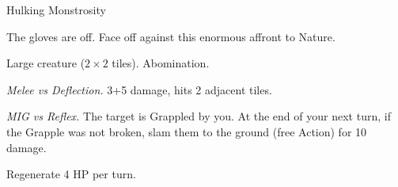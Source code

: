 \begin{monsterboxbg}{Hulking Monstrosity}

    The gloves are off. Face off against this enormous affront to Nature.
    
    \rpghline
    \stats[
        STR = \stat{20}, 
        DEX = \stat{14},
        CON = \stat{18},
        INT = \stat{10},
        WIS = \stat{10},
        CHA = \stat{12},
    ]
    \rpghline

    \basics[
    armorclass = 1,
    hitpoints  = 64,
    focus      = 5,
    defenses   = {Deflection 3, Reflex 3, Fortitude 9, Will 1}
    ]
    \rpghline

    \details[%
    skills = {Athletics 2},
    accuracies = {Melee 4, Ranged 0},
    challenge = Elite,
    ]
    \rpghline%
    \begin{rpg-monsteraction}
        Large creature ($2 \times 2$ tiles). Abomination.
    \end{rpg-monsteraction}

    

    \begin{rpg-monsteraction}
        \textit{Melee vs Deflection.} 3+5 damage, hits 2 adjacent tiles.
    \end{rpg-monsteraction}

    \begin{rpg-monsteraction}
        \textit{MIG vs Reflex.} The target is Grappled by you. At the end of your next turn, if the Grapple was not broken, slam them to the ground (free Action) for 10 damage.
    \end{rpg-monsteraction}

    \begin{rpg-monsteraction}
    \end{rpg-monsteraction}

    \begin{rpg-monsteraction}
    \end{rpg-monsteraction}


    \begin{rpg-monsteraction}[Stalwart]
    \end{rpg-monsteraction}

    \begin{rpg-monsteraction}
        Regenerate 4 HP per turn.
    \end{rpg-monsteraction}


\end{monsterboxbg}



